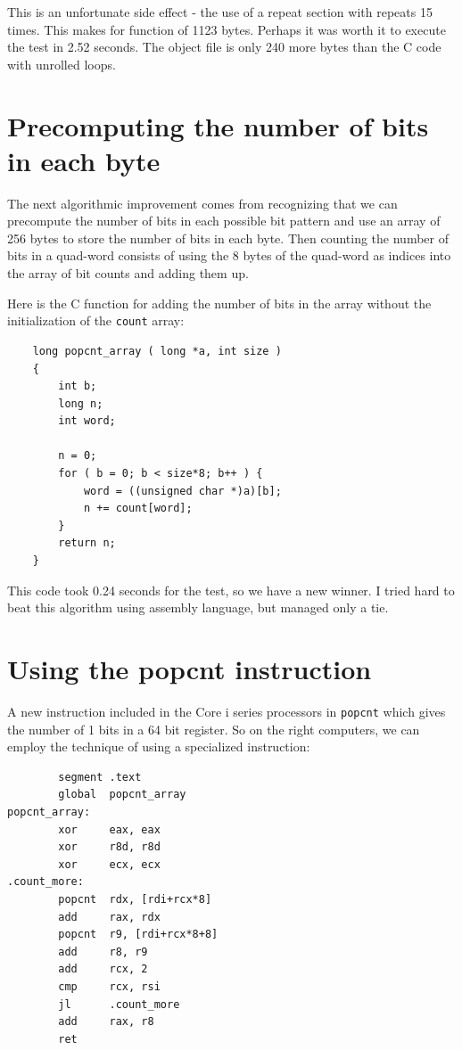 \documentclass[11pt,b5paper]{book}
\begin{document}
This is an unfortunate side effect - the use of a repeat section with repeats
15 times.  This makes for function of 1123 bytes.  Perhaps it was worth it
to execute the test in 2.52 seconds.  The object file is only 240 more bytes than
the C code with unrolled loops.

\section{Precomputing the number of bits in each byte}

The next algorithmic improvement comes from recognizing that we can precompute
the number of bits in each possible bit pattern and use an array of 256 bytes
to store the number of bits in each byte.
Then counting the number of bits in a quad-word consists of using the 8 bytes
of the quad-word as indices into the array of bit counts and adding them up.

Here is the C function for adding the number of bits in the array without
the initialization of the {\tt count} array:
\begin{verbatim}
    long popcnt_array ( long *a, int size )
    {
        int b;
        long n;
        int word;
    
        n = 0;
        for ( b = 0; b < size*8; b++ ) {
            word = ((unsigned char *)a)[b];
            n += count[word];
        }
        return n;
    }
\end{verbatim}

This code took 0.24 seconds for the test, so we have a new winner.
I tried hard to beat this algorithm using assembly language, but managed only a tie.

\section{Using the popcnt instruction}

A new instruction included in the Core i series processors in {\tt popcnt} which
gives the number of 1 bits in a 64 bit register.
So on the right computers, we can employ the technique of using a specialized 
instruction:

\begin{verbatim}
        segment .text
        global  popcnt_array
popcnt_array:
        xor     eax, eax
        xor     r8d, r8d
        xor     ecx, ecx
.count_more:
        popcnt  rdx, [rdi+rcx*8]
        add     rax, rdx
        popcnt  r9, [rdi+rcx*8+8]
        add     r8, r9
        add     rcx, 2
        cmp     rcx, rsi
        jl      .count_more
        add     rax, r8
        ret
\end{verbatim}
\end{document}
